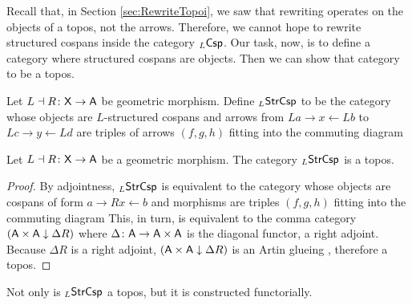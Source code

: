 \documentclass[oneside]{amsart}
\begin{document}
Recall that, in Section \ref{sec:RewriteTopoi}, we saw
that rewriting operates on the objects of a topos,
not the arrows. Therefore, we cannot hope to rewrite
structured cospans inside the category $ _L\mathsf{Csp} $. Our
task, now, is to define a category where structured
cospans are objects. Then we can show that category to be a
topos.

\begin{definition} \label{df:morph-of-strcsp} Let
  $ L \dashv R \colon \mathsf{X} \to \mathsf{A} $ be geometric
  morphism. Define $ _L \mathsf{StrCsp} $ to be the category whose
  objects are $ L $-structured cospans and arrows from
  $ La \to x \gets Lb $ to $ Lc \to y \gets Ld $ are triples
  of arrows $ ( f,g,h ) $ fitting into the commuting diagram
  
\end{definition}

\begin{theorem} \label{thm:strcsp-istopos} Let
  $ L \dashv R \colon \mathsf{X} \to \mathsf{A} $ be a geometric
  morphism.  The category $ _{L}\mathsf{StrCsp} $ is a
  topos.
\end{theorem}
\begin{proof}
  By adjointness, $ _{L}\mathsf{StrCsp} $ is equivalent to
  the category whose objects are cospans of form
  $ a \to Rx \gets b $ and morphisms are triples
  $ ( f,g,h ) $ fitting into the commuting diagram
   This, in
  turn, is equivalent to the comma category
  $ ( \mathsf{A} \times \mathsf{A} \downarrow \Delta R ) $ where
  $ \Delta \colon \mathsf{A} \to \mathsf{A} \times \mathsf{A} $ is the
  diagonal functor, a right adjoint. Because
  $ \Delta R $ is a right adjoint,
  $ ( \mathsf{A} \times \mathsf{A} \downarrow \Delta R ) $ is an
  Artin glueing \parencite{Wraith_ArtinGlue}, therefore
  a topos.
\end{proof}

Not only is $ _L\mathsf{StrCsp} $ a topos, but it is constructed functorially.
\end{document}
